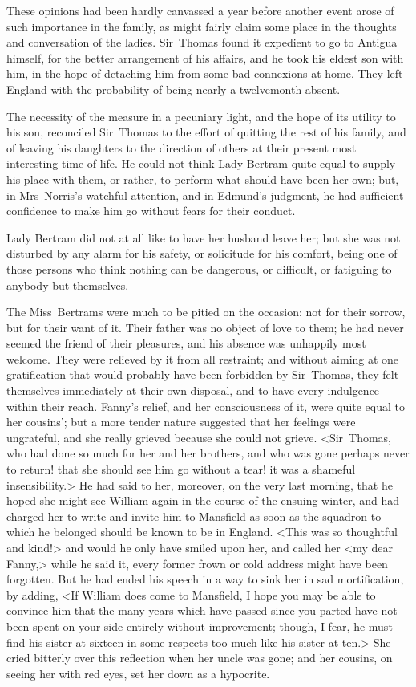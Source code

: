 These opinions had been hardly canvassed a year before another event arose of such importance in the family, as might fairly claim some place in the thoughts and conversation of the ladies. Sir~Thomas found it expedient to go to Antigua himself, for the better arrangement of his affairs, and he took his eldest son with him, in the hope of detaching him from some bad connexions at home. They left England with the probability of being nearly a twelvemonth absent.

The necessity of the measure in a pecuniary light, and the hope of its utility to his son, reconciled Sir~Thomas to the effort of quitting the rest of his family, and of leaving his daughters to the direction of others at their present most interesting time of life. He could not think Lady Bertram quite equal to supply his place with them, or rather, to perform what should have been her own; but, in Mrs~Norris's watchful attention, and in Edmund's judgment, he had sufficient confidence to make him go without fears for their conduct.

Lady Bertram did not at all like to have her husband leave her; but she was not disturbed by any alarm for his safety, or solicitude for his comfort, being one of those persons who think nothing can be dangerous, or difficult, or fatiguing to anybody but themselves.

The Miss~Bertrams were much to be pitied on the occasion: not for their sorrow, but for their want of it. Their father was no object of love to them; he had never seemed the friend of their pleasures, and his absence was unhappily most welcome. They were relieved by it from all restraint; and without aiming at one gratification that would probably have been forbidden by Sir~Thomas, they felt themselves immediately at their own disposal, and to have every indulgence within their reach. Fanny's relief, and her consciousness of it, were quite equal to her cousins'; but a more tender nature suggested that her feelings were ungrateful, and she really grieved because she could not grieve. <Sir~Thomas, who had done so much for her and her brothers, and who was gone perhaps never to return! that she should see him go without a tear! it was a shameful insensibility.> He had said to her, moreover, on the very last morning, that he hoped she might see William again in the course of the ensuing winter, and had charged her to write and invite him to Mansfield as soon as the squadron to which he belonged should be known to be in England. <This was so thoughtful and kind!> and would he only have smiled upon her, and called her <my dear Fanny,> while he said it, every former frown or cold address might have been forgotten. But he had ended his speech in a way to sink her in sad mortification, by adding, <If William does come to Mansfield, I hope you may be able to convince him that the many years which have passed since you parted have not been spent on your side entirely without improvement; though, I fear, he must find his sister at sixteen in some respects too much like his sister at ten.> She cried bitterly over this reflection when her uncle was gone; and her cousins, on seeing her with red eyes, set her down as a hypocrite. 